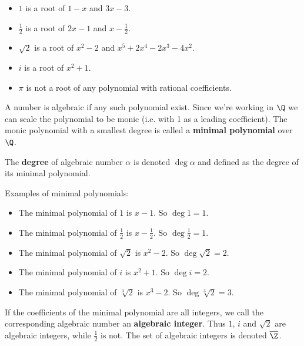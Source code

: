 \begin{ex}$\,$
    \begin{itemize}
        \item $1$ is a root of $1-x$ and $3x-3$.
        \item $\frac{1}{2}$ is a root of $2x - 1$ and $x - \frac{1}{2}$.
        \item $\sqrt{2}$ is a root of $x^2 - 2$ and $x^5 + 2x^4 - 2x^3 - 4x^2$.
        \item $i$ is a root of $x^2 + 1$.
        \item $\pi$ is not a root of any polynomial with rational coefficients.
    \end{itemize}
\end{ex}

\begin{df}
    A number is algebraic if any such polynomial exist. Since we're working in $\Q$ we can scale the polynomial to be monic (i.e. with 1 as a leading coefficient). The monic polynomial with a smallest degree is called a \textbf{minimal polynomial} over $\Q$.
\end{df}

\begin{df}
    The \textbf{degree} of algebraic number $\alpha$ is denoted $\deg \alpha$ and defined as the degree of its minimal polynomial.
\end{df}

\begin{ex} Examples of minimal polynomials:
    \begin{itemize}
        \item The minimal polynomial of $1$ is $x-1$. So $\deg 1 = 1$.
        \item The minimal polynomial of $\frac{1}{2}$ is $x - \frac{1}{2}$. So $\deg \frac{1}{2} = 1$.
        \item The minimal polynomial of $\sqrt{2}$ is $x^2 - 2$. So $\deg \sqrt{2} = 2$.
        \item The minimal polynomial of $i$ is $x^2 + 1$. So $\deg i = 2$.
        \item The minimal polynomial of $\sqrt[3]{2}$ is $x^3 - 2$. So $\deg \sqrt[3]{2} = 3$.
    \end{itemize}
\end{ex}

\begin{df}
    If the coefficients of the minimal polynomial are all integers, we call the corresponding algebraic number an \textbf{algebraic integer}. Thus $1$, $i$ and $\sqrt{2}$ are algebraic integers, while $\frac{1}{2}$ is not.
    The set of algebraic integers is denoted $\overline{\Z}$.
\end{df}

